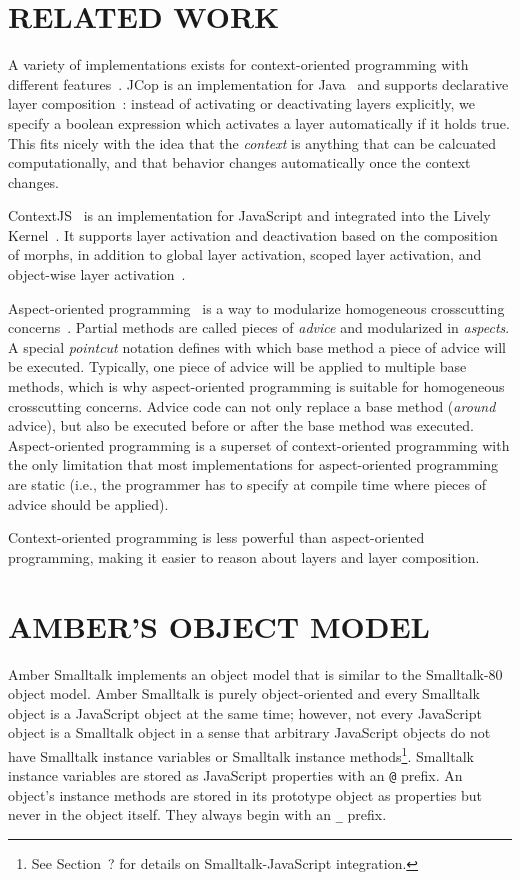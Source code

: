 \documentclass[english,paper=a4,twocolumn=true,DIV=calc,fontsize=9pt]{scrartcl}
\begin{document}
\section{RELATED WORK}
A variety of implementations exists for context-oriented programming with different features~\cite{Appeltauer:2009:CCP:1562112.1562118}. JCop is an implementation for Java~\cite{Schuster:2011:CPM:2068736.2068741} and supports declarative layer composition~\cite{appeltauer2012declarative}: instead of activating or deactivating layers explicitly, we specify a boolean expression which activates a layer automatically if it holds true. This fits nicely with the idea that the \emph{context} is anything that can be calcuated computationally, and that behavior changes automatically once the context changes.

ContextJS~\cite{Lincke:2011:OIC:1998661.1998804} is an implementation for JavaScript and integrated into the Lively Kernel~\cite{Taivalsaari:2008:WBA:1698208}. It supports layer activation and deactivation based on the composition of morphs, in addition to global layer activation, scoped layer activation, and object-wise layer activation~\cite{10.1109/C5.2012.20}.

Aspect-oriented programming~\cite{Kiczales:2001:AP:503271.503260} is a way to modularize homogeneous crosscutting concerns~\cite{apel2006structure}. Partial methods are called pieces of \emph{advice} and modularized in \emph{aspects}. A special \emph{pointcut} notation defines with which base method a piece of advice will be executed. Typically, one piece of advice will be applied to multiple base methods, which is why aspect-oriented programming is suitable for homogeneous crosscutting concerns. Advice code can not only replace a base method (\emph{around} advice), but also be executed before or after the base method was executed. Aspect-oriented programming is a superset of context-oriented programming with the only limitation that most implementations for aspect-oriented programming are static (i.e., the programmer has to specify at compile time where pieces of advice should be applied).

Context-oriented programming is less powerful than aspect-oriented programming, making it easier to reason about layers and layer composition.

\section{AMBER'S OBJECT MODEL}
Amber Smalltalk implements an object model that is similar to the Smalltalk-80 object model. Amber Smalltalk is purely object-oriented and every Smalltalk object is a JavaScript object at the same time; however, not every JavaScript object is a Smalltalk object in a sense that arbitrary JavaScript objects do not have Smalltalk instance variables or Smalltalk instance methods\footnote{See Section~? for details on Smalltalk-JavaScript integration.}. Smalltalk instance variables are stored as JavaScript properties with an \texttt{@} prefix. An object's instance methods are stored in its prototype object as properties but never in the object itself. They always begin with an \texttt{\_} prefix.
\end{document}
